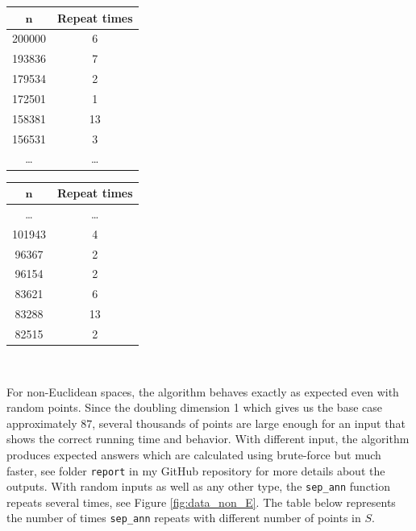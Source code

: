\documentclass[12pt,english,]{article}
\newcommand{\code}[1]{\colorbox{light-gray}{\texttt{#1}}}
\let\origfigure\figure
\let\endorigfigure\endfigure
\renewenvironment{figure}[1][2] {
    \expandafter\origfigure\expandafter[H]
} {
    \endorigfigure
}
\begin{document}
\begin{figure}
\begin{minipage}{0.48\textwidth}
  \centering
  \begin{tabular}{|c|c|}
  \hline
  $\boldsymbol n$   & \textbf{Repeat times} \\ \hline
   200000  & 6            \\ \hline
   193836  & 7            \\ \hline
   179534  & 2            \\ \hline
   172501  & 1            \\ \hline
   158381  & 13           \\ \hline
   156531  & 3            \\ \hline
  \ldots   & \ldots       \\ \hline
  \end{tabular}
\end{minipage}
\begin{minipage}{0.48\textwidth}
  \centering
  \begin{tabular}{|c|c|}
  \hline
  $\boldsymbol n$   & \textbf{Repeat times} \\ \hline
  \ldots   & \ldots       \\ \hline
  101943   & 4            \\ \hline
   96367   & 2            \\ \hline
   96154   & 2            \\ \hline
   83621   & 6            \\ \hline
   83288   & 13           \\ \hline
   82515   & 2            \\ \hline
  \end{tabular}
\end{minipage}
\caption[Caption]{Given an input of $200\,000$ points generated in a grid. This is a portion of the data about the number of times the algorithm \textsc{SepAnn$(S,n,d,\mu,c)$} repeats.}
\label{fig:data}
\end{figure}

~

For non-Euclidean spaces, the algorithm behaves exactly as expected even
with random points. Since the doubling dimension 1 which gives us the
base case approximately \(87\), several thousands of points are large
enough for an input that shows the correct running time and behavior.
With different input, the algorithm produces expected answers which are
calculated using brute-force but much faster, see folder \code{report}
in my GitHub repository for more details about the outputs. With random
inputs as well as any other type, the \code{sep\_ann} function repeats
several times, see Figure \ref{fig:data_non_E}. The table below
represents the number of times \code{sep\_ann} repeats with different
number of points in \(S\).
\end{document}
